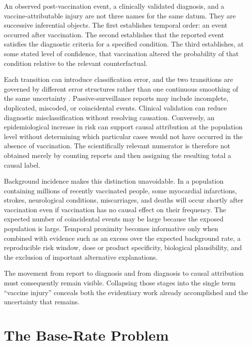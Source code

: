 \documentclass[11pt]{article}
\begin{document}
An observed post-vaccination event, a clinically validated diagnosis, and a vaccine-attributable injury are not three names for the same datum. They are successive inferential objects. The first establishes temporal order: an event occurred after vaccination. The second establishes that the reported event satisfies the diagnostic criteria for a specified condition. The third establishes, at some stated level of confidence, that vaccination altered the probability of that condition relative to the relevant counterfactual.

Each transition can introduce classification error, and the two transitions are governed by different error structures rather than one continuous smoothing of the same uncertainty \citep{gustafson2003}. Passive-surveillance reports may include incomplete, duplicated, miscoded, or coincidental events. Clinical validation can reduce diagnostic misclassification without resolving causation. Conversely, an epidemiological increase in risk can support causal attribution at the population level without determining which particular cases would not have occurred in the absence of vaccination. The scientifically relevant numerator is therefore not obtained merely by counting reports and then assigning the resulting total a causal label.

Background incidence makes this distinction unavoidable. In a population containing millions of recently vaccinated people, some myocardial infarctions, strokes, neurological conditions, miscarriages, and deaths will occur shortly after vaccination even if vaccination has no causal effect on their frequency. The expected number of coincidental events may be large because the exposed population is large. Temporal proximity becomes informative only when combined with evidence such as an excess over the expected background rate, a reproducible risk window, dose or product specificity, biological plausibility, and the exclusion of important alternative explanations.

The movement from report to diagnosis and from diagnosis to causal attribution must consequently remain visible. Collapsing those stages into the single term ``vaccine injury'' conceals both the evidentiary work already accomplished and the uncertainty that remains.

\section{The Base-Rate Problem}
\end{document}
